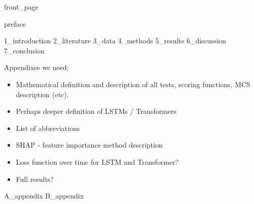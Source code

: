 \documentclass{article}
\begin{document}
 

{front_page}

\newpage
\null
\thispagestyle{empty}
\newpage

\frontmatter

{preface}
\newpage



\begin{abstract}
    {0_abstract}
\end{abstract}
\clearpage


\tableofcontents

\listoffigures
\listoftables

\mainmatter


{1_introduction}
\newpage
{2_literature}
\newpage
{3_data}
\newpage
{4_methods}
\newpage
{5_results}
\newpage
{6_discussion}
\newpage
{7_conclusion}

\newpage
% 
\printbibliography


\addappendix

Appendixes we need:
\begin{itemize}
    \item Mathematical definition and description of all tests, scoring functions, MCS description (etc).
    \item Perhaps deeper definition of LSTMs / Transformers
    \item List of abbreviations
    \item SHAP - feature importance method description
    \item Loss function over time for LSTM and Transformer?
    \item Full results?
\end{itemize}
{A_appendix}
{B_appendix}


\end{document}
